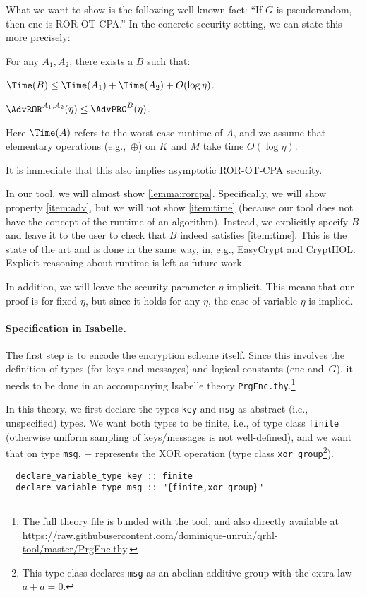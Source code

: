 \documentclass{article}
\newcommand\giturl[1]{\url{https://raw.githubusercontent.com/dominique-unruh/qrhl-tool/master/#1}}
\begin{document}
What we want to show is the following well-known fact: ``If $G$
is pseudorandom, then $\mathrm{enc}$
is ROR-OT-CPA.'' In the concrete security setting, we can state this
more precisely:
\begin{lemma}\label{lemma:rorcpa}
  For any $A_1,A_2$, there exists a $B$ such that:
  \begin{compactenum}[(i)]
  \item\label{item:time} $\Time(B) \leq \Time(A_1) + \Time(A_2) + O(\log \eta)$. 
  \item\label{item:adv} $\AdvROR^{A_1,A_2}(\eta) \leq \AdvPRG^B(\eta)$.
  \end{compactenum}
  Here \symbolindexmark\Time$\Time(A)$
  refers to the worst-case runtime of $A$,
  and we assume that elementary operations (e.g.,~$\oplus$)
  on $K$ and $M$ take time $O(\log\eta)$.
\end{lemma}
It is immediate that this also implies asymptotic ROR-OT-CPA security.

In our tool, we will almost show \autoref{lemma:rorcpa}. Specifically,
we will show property \eqref{item:adv}, but we will not show
\eqref{item:time} (because our tool does not have the concept of the
runtime of an algorithm). Instead, we explicitly specify $B$
and leave it to the user to check that $B$
indeed satisfies \eqref{item:time}. This is the state of the art and
is done in the same way, in, e.g., EasyCrypt and CryptHOL. Explicit reasoning about
runtime is left as future work.

In addition, we will leave the security parameter $\eta$
implicit. This means that our proof is for fixed $\eta$,
but since it holds for any $\eta$,
the case of variable $\eta$ is implied.


\paragraph{Specification in Isabelle.} The first step is to encode the
encryption scheme itself. Since this involves the definition of types
(for keys and messages) and logical constants ($\mathrm{enc}$
and~$G$),
it needs to be done in an accompanying Isabelle theory
\texttt{PrgEnc.thy}.\footnote{The full theory file is bunded with the tool,
  and also directly available at \giturl{PrgEnc.thy}.}

In this theory, we first declare the types \texttt{key} and
\texttt{msg} as abstract (i.e., unspecified) types. We want both types
to be finite, i.e., of type class \texttt{finite} (otherwise uniform
sampling of keys/messages is not well-defined), and we want that on
type \texttt{msg}, $+$
represents the XOR operation (type class \texttt{xor\_group}\footnote{This type class
  declares \texttt{msg} as an abelian additive group with the extra law $a+a=0$.}).
\begin{lstlisting}
  declare_variable_type key :: finite
  declare_variable_type msg :: "{finite,xor_group}"
\end{lstlisting}
\end{document}
